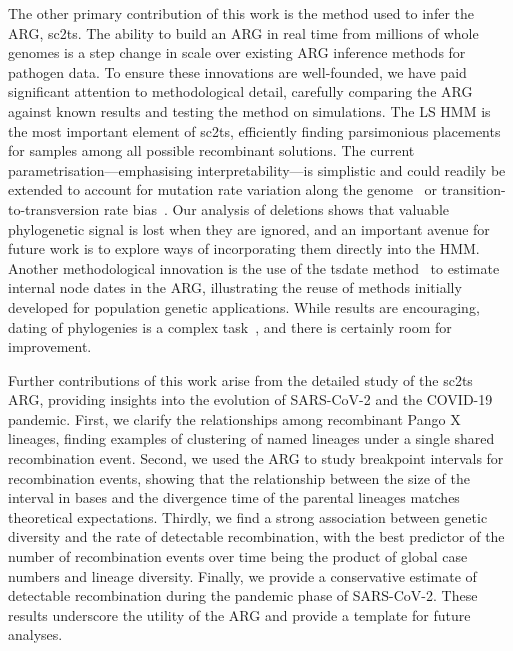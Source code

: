 \documentclass[12pt]{article}
\begin{document}
The other primary contribution of this work is the method used to
infer the ARG, sc2ts.
The ability to build an ARG in real time from millions of whole
genomes is a step change in scale over existing ARG
inference methods for pathogen data\cite{Didelot2010inference,%
Vaughan2017inferring,%
Muller2020bayesian,%
Ignatieva2022,%
Muller2022bayesian}.
To ensure these innovations are well-founded, we have paid significant
attention to methodological detail, carefully comparing the ARG
against known results and testing the method on simulations.
The LS HMM is the most important element of
sc2ts, efficiently finding parsimonious placements for samples
among all possible recombinant solutions. The current
parametrisation---emphasising interpretability---is simplistic
and could readily be extended to account
for mutation rate variation along the genome~\cite{Haddox2025}
or transition-to-transversion rate bias~\cite{Bloom2023,Simmonds2024}.
Our analysis of deletions shows that valuable phylogenetic signal
is lost when they are ignored, and an important avenue for
future work is to explore ways of incorporating them directly into the HMM.
Another methodological innovation is the use of
the tsdate method~\cite{Wohns2022,Pope2025} to estimate internal node dates
in the ARG, illustrating the reuse of methods initially developed
for population genetic applications. While results are encouraging,
dating of phylogenies is a complex task~\cite{Kumar2016advances},
and there is certainly room for improvement.

Further contributions of this work arise from
the detailed study of the sc2ts ARG,
providing insights into the evolution of SARS-CoV-2
and the COVID-19 pandemic.
First, we clarify the relationships among
recombinant Pango X lineages, finding examples of
clustering of named lineages under a single shared recombination event.
Second, we used the ARG to study breakpoint intervals
for recombination events, showing that the relationship between the
size of the interval in bases and the divergence time of the parental lineages matches theoretical expectations.
Thirdly, we find a strong association between
genetic diversity and the rate of detectable recombination,
with the best predictor of the number of recombination
events over time being the product of global case numbers
and lineage diversity.
Finally, we provide a conservative estimate of
detectable recombination during the pandemic phase of SARS-CoV-2.
These results underscore the utility of the ARG
and provide a template for future analyses.
\end{document}
